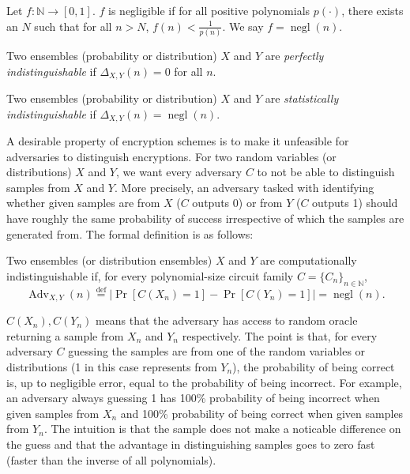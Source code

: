 \begin{definition}
    Let $f \colon \mathbb{N} \to [0,1]$. $f$ is negligible if for all positive polynomials $p(\cdot)$, there exists an $N$ such that for all $n>N$, $f(n) < \frac{1}{p(n)}$. We say $f = \operatorname{negl}(n)$.
\end{definition}
\begin{definition} \label{def:perfectly-indistinguishable}
    Two ensembles (probability or distribution) $X$ and $Y$ are \emph{perfectly indistinguishable} if $\Delta_{X,Y}(n) = 0$ for all $n$.
\end{definition}
\begin{definition} \label{def:statistically-indistinguishable}
    Two ensembles (probability or distribution) $X$ and $Y$ are \emph{statistically indistinguishable} if $\Delta_{X,Y}(n) = \operatorname{negl}(n)$.
\end{definition}
 A desirable property of encryption schemes is to make it unfeasible for adversaries to distinguish encryptions. For two random variables (or distributions) $X$ and $Y$, we want every adversary $C$ to not be able to distinguish samples from $X$ and $Y$. More precisely, an adversary tasked with identifying whether given samples are from $X$ ($C$ outputs 0) or from $Y$ ($C$ outputs 1) should have roughly the same probability of success irrespective of which the samples are generated from. The formal definition is as follows:
\begin{definition} \label{def:computationally-indistinguishable}
    Two ensembles (or distribution ensembles) $X$ and $Y$ are computationally indistinguishable if, for every polynomial-size circuit family $C = \{C_n\}_{n \in \mathbb{N}}$, $$\operatorname{Adv}_{X,Y}(n) \stackrel{\mathrm{def}}{=} |\operatorname{Pr}[C(X_n) = 1] - \operatorname{Pr}[C(Y_n) = 1]| = \operatorname{negl}(n).$$
\end{definition}
$C(X_n), C(Y_n)$ means that the adversary has access to random oracle returning a sample from $X_n$ and $Y_n$ respectively. The point is that, for every adversary $C$ guessing the samples are from one of the random variables or distributions (1 in this case represents from $Y_n$), the probability of being correct is, up to negligible error, equal to the probability of being incorrect. For example, an adversary always guessing 1 has 100\% probability of being incorrect when given samples from $X_n$ and 100\% probability of being correct when given samples from $Y_n$. The intuition is that the sample does not make a noticable difference on the guess and that the advantage in distinguishing samples goes to zero fast (faster than the inverse of all polynomials).

